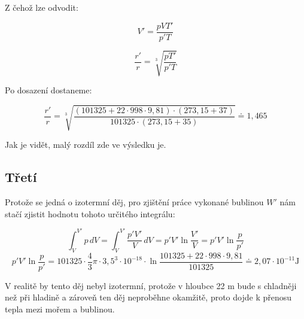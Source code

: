 \documentclass{fkssolpub}
\begin{document}
Z čehož lze odvodit:

\[
	V' = \frac{p V T'}{p' T}
\]

\[
	\frac{r'}{r} = \sqrt[3]{\frac{p T'}{p' T}}
\]

Po dosazení dostaneme:

\[
	\frac{r'}{r} = \sqrt[3]{\frac{(101325 + 22 \cdot 998 \cdot 9{,}81) \cdot (273{,}15 + 37)}{101325 \cdot (273,15 + 35)}}
	\doteq 1{,}465
\]

Jak je vidět, malý rozdíl zde ve výsledku je.

\subsection{Třetí}

Protože se jedná o izotermní děj, pro zjištění práce vykonané bublinou $W'$ nám
stačí zjistit hodnotu tohoto určitého integrálu:

\[
	\int^{V'}_{V} p \, dV = \int^{V'}_{V} \frac{p' V'}{V} \, dV
	= p' V' \ln \frac{V'}{V} = p' V' \ln \frac{p}{p'}
\]
\[
	p' V' \ln \frac{p}{p'}
	= 101325 \cdot \frac{4}{3} \pi \cdot 3{,}5^3 \cdot 10^{-18} \cdot \ln \frac{101325 + 22 \cdot 998 \cdot 9{,}81}{101325}
	\doteq 2{,}07 \cdot 10^{-11} \text{J}
\]

V realitě by tento děj nebyl izotermní, protože v hloubce 22 m bude s chladněji
než při hladině a zároveň ten děj neproběhne okamžitě, proto dojde k přenosu
tepla mezi mořem a bublinou.
\end{document}
